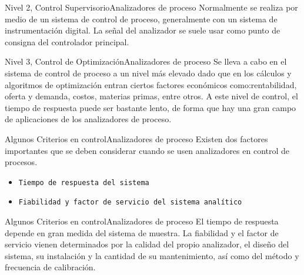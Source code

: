 \documentclass[10pt]{beamer}
\begin{document}
{ %
   \begin{frame}{Nivel 2, Control Supervisorio}{Analizadores de proceso}
Normalmente se realiza por medio de un  sistema de control de proceso, generalmente con un sistema de instrumentación digital.
\vskip 0.5cm
La señal del analizador se suele usar como punto de consigna del controlador principal.
\end{frame}
 \begin{frame}{Nivel 3, Control de Optimización}{Analizadores de proceso}
Se lleva a cabo en el sistema de control de proceso a un nivel más elevado dado que en los cálculos y algoritmos de optimización entran ciertos factores 
económicos como:rentabilidad, oferta y demanda, costos, materias primas, entre otros.   
\vskip 0.5cm
A este nivel de control, el tiempo de respuesta puede ser bastante lento, de forma que hay una gran campo de aplicaciones de los analizadores de proceso.
\end{frame}
 \begin{frame}{Algunos Criterios en control}{Analizadores de proceso}
Existen dos factores importantes que se deben considerar cuando se usen analizadores en control de procesos.
 \begin{block}{ }
  	\begin{itemize}
    \item {\tt Tiempo de respuesta del sistema}
    \item {\tt Fiabilidad y factor de servicio del sistema analítico}
    \end{itemize}
	\end{block}
    \end{frame}
 \begin{frame}{Algunos Criterios en control}{Analizadores de proceso}
El tiempo de respuesta depende en gran medida del sistema de muestra.
\vskip 0.5cm
La fiabilidad y el factor de servicio vienen determinados por la calidad del propio analizador, el diseño del sistema, su instalación y la cantidad de su mantenimiento, así como del método y frecuencia de calibración.   

\end{frame}}
\end{document}

